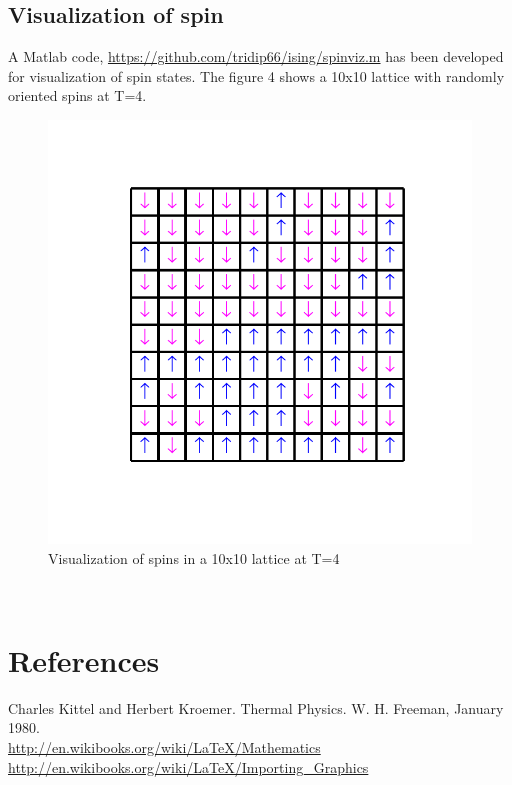 \documentclass[]{article}
\begin{document}
\subsection{Visualization of spin}
A Matlab code, \url{https://github.com/tridip66/ising/spinviz.m} has been developed for visualization of spin states. The figure 4 shows a 10x10 lattice with randomly oriented spins at T=4.
\begin{figure}[H]
  \centering
  \includegraphics[scale=0.5]{figures/fig_6}%
  \caption{\label{fig:epsart} Visualization of spins in a 10x10 lattice at T=4}
\end{figure}
\\
\section*{References}
Charles Kittel and Herbert Kroemer. Thermal Physics. W. H. Freeman, January 1980. 
\\
\url{http://en.wikibooks.org/wiki/LaTeX/Mathematics}
\\
\url{http://en.wikibooks.org/wiki/LaTeX/Importing_Graphics}
\\
\appendix
\end{document}
